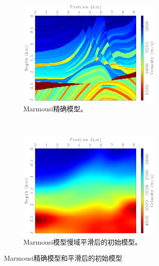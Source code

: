 \documentclass[degree=doctor]{thuthesis}
\begin{document}
\begin{figure}[ht]
    \centering
    \begin{subfigure}[b]{0.5\textwidth}
        \centering
        \includegraphics[height=2.1in]{marmvel.pdf}
        \caption{Marmousi精确模型。}
        \label{fig:Marmousi精确模型}
    \end{subfigure}%
    ~
    \begin{subfigure}[b]{0.5\textwidth}
        \centering
        \includegraphics[height=2.1in]{marmvel_smoothed.pdf}
        \caption{Marmousi模型慢域平滑后的初始模型。}
        \label{fig:Marmousi模型慢域平滑后的初始模型}
    \end{subfigure}
    \caption{Marmousi精确模型和平滑后的初始模型}
    \label{fig:Marmousi精确模型和平滑后的初始模型}
\end{figure}
\end{document}
